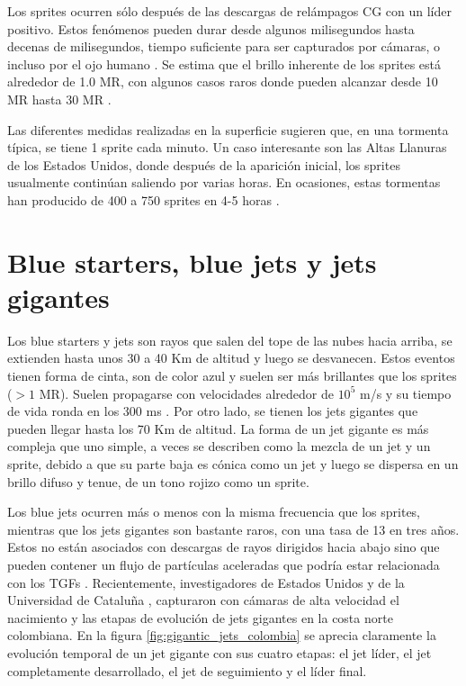 \documentclass[12pt,oneside,openany,letter]{book}
\begin{document}
Los sprites ocurren sólo después de las descargas de relámpagos CG con un líder positivo. Estos fenómenos pueden durar desde algunos milisegundos hasta decenas de milisegundos, tiempo suficiente para ser capturados por cámaras, o incluso por el ojo humano \cite{Maiorana2014}. Se estima que el brillo inherente de los sprites está alrededor de 1.0 MR, con algunos casos raros donde pueden alcanzar desde 10 MR hasta 30 MR \cite{FullekrugEtal2006}. 

Las diferentes medidas realizadas en la superficie sugieren que, en una tormenta típica, se tiene 1 sprite cada minuto. Un caso interesante son las Altas Llanuras de los Estados Unidos, donde después de la aparición inicial, los sprites usualmente continúan saliendo por varias horas. En ocasiones, estas tormentas han producido de 400 a 750 sprites en 4-5 horas \cite{FullekrugEtal2006}.

\section{Blue starters, blue jets y jets gigantes}
Los blue starters y jets son rayos que salen del tope de las nubes hacia arriba, se extienden hasta unos 30 a 40 Km de altitud y luego se desvanecen. Estos eventos tienen forma de cinta, son de color azul y suelen ser más brillantes que los sprites ($>1$ MR). Suelen propagarse con velocidades alrededor de $10^5$ m/s y su tiempo de vida ronda en los 300 ms \cite{DwyerUman2014}. Por otro lado, se tienen los jets gigantes que pueden llegar hasta los 70 Km de altitud. La forma de un jet gigante es más compleja que uno simple, a veces se describen como la mezcla de un jet y un sprite, debido a que su parte baja es cónica como un jet y luego se dispersa en un brillo difuso y tenue, de un tono rojizo como un sprite. 

Los blue jets ocurren más o menos con la misma frecuencia que los sprites, mientras que los jets gigantes son bastante raros, con una tasa de 13 en tres años. Estos no están asociados con descargas de rayos dirigidos hacia abajo sino que pueden contener un flujo de partículas aceleradas que podría estar relacionada con los TGFs \cite{Maiorana2014}. Recientemente, investigadores de Estados Unidos y de la Universidad de Cataluña \cite{VanEtal2019}, capturaron con cámaras de alta velocidad el nacimiento y las etapas de evolución de jets gigantes en la costa norte colombiana. En la figura \ref{fig:gigantic_jets_colombia} se aprecia claramente la evolución temporal de un jet gigante con sus cuatro etapas: el jet líder, el jet completamente desarrollado, el jet de seguimiento y el líder final. 
\end{document}

